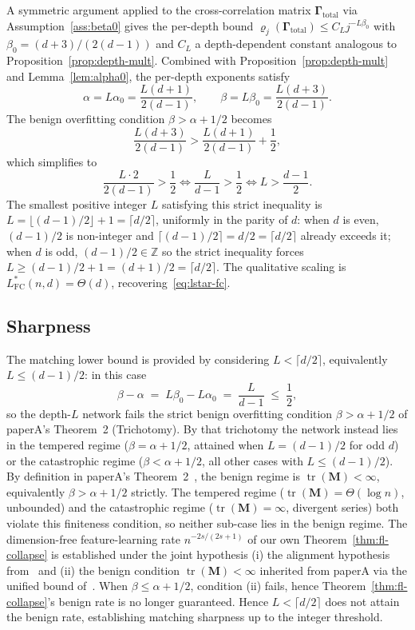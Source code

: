 \documentclass[12pt]{amsart}
\theoremstyle{definition}
\theoremstyle{remark}
\DeclareMathOperator{\tr}{tr}
\newcommand{\bM}{\mathbf{M}}
\newcommand{\bGamma}{\boldsymbol{\Gamma}}
\begin{document}
A symmetric argument applied to the cross-correlation matrix
$\bGamma_{\mathrm{total}}$ via Assumption~\ref{ass:beta0} gives the per-depth
bound $\varrho_{j}(\bGamma_{\mathrm{total}}) \leq C_{L} j^{-L\beta_{0}}$
with $\beta_{0} = (d+3)/(2(d-1))$ and $C_{L}$ a depth-dependent constant
analogous to Proposition~\ref{prop:depth-mult}. Combined with
Proposition~\ref{prop:depth-mult} and Lemma~\ref{lem:alpha0}, the
per-depth exponents satisfy
\[
  \alpha = L\alpha_{0} = \frac{L(d+1)}{2(d-1)}, \qquad
  \beta = L\beta_{0} = \frac{L(d+3)}{2(d-1)}.
\]
The benign overfitting condition $\beta > \alpha + 1/2$ becomes
\[
  \frac{L(d+3)}{2(d-1)} > \frac{L(d+1)}{2(d-1)} + \frac{1}{2},
\]
which simplifies to
\[
  \frac{L\cdot 2}{2(d-1)} > \frac{1}{2}
  \iff
  \frac{L}{d-1} > \frac{1}{2}
  \iff
  L > \frac{d-1}{2}.
\]
The smallest positive integer $L$ satisfying this strict inequality is
$L = \lfloor (d-1)/2 \rfloor + 1 = \lceil d/2 \rceil$, uniformly in the
parity of $d$: when $d$ is even, $(d-1)/2$ is non-integer and
$\lceil (d-1)/2\rceil = d/2 = \lceil d/2 \rceil$ already exceeds it;
when $d$ is odd, $(d-1)/2 \in \mathbb{Z}$ so the strict inequality
forces $L \ge (d-1)/2 + 1 = (d+1)/2 = \lceil d/2 \rceil$. The
qualitative scaling is $L^{*}_{\mathrm{FC}}(n,d) = \Theta(d)$,
recovering~\eqref{eq:lstar-fc}.

\subsection{Sharpness}

The matching lower bound is provided by considering
$L < \lceil d/2 \rceil$, equivalently $L \le (d-1)/2$: in this case
\[
  \beta - \alpha \;=\; L\beta_{0} - L\alpha_{0}
  \;=\; \frac{L}{d-1} \;\le\; \frac{1}{2},
\]
so the depth-$L$ network fails the strict benign overfitting condition
$\beta > \alpha + 1/2$ of paperA's Theorem~2 (Trichotomy). By that
trichotomy the network instead lies in the tempered regime
($\beta = \alpha + 1/2$, attained when $L = (d-1)/2$ for odd $d$) or
the catastrophic regime ($\beta < \alpha + 1/2$, all other cases with
$L \le (d-1)/2$). By definition in paperA's Theorem~2~\cite[Theorem~2]{paperA}, the
benign regime is $\tr(\bM) < \infty$, equivalently
$\beta > \alpha + 1/2$ strictly. The tempered regime
($\tr(\bM) = \Theta(\log n)$, unbounded) and the catastrophic
regime ($\tr(\bM) = \infty$, divergent series) both violate this
finiteness condition, so neither sub-case lies in the benign
regime. The dimension-free feature-learning rate $n^{-2s/(2s+1)}$
of our own Theorem~\ref{thm:fl-collapse} is established under the
joint hypothesis (i) the alignment hypothesis from~\cite{paperB}
and (ii) the benign condition $\tr(\bM) < \infty$ inherited from
paperA via the unified bound of~\cite[Thm.~1]{paperA}.  When
$\beta \le \alpha + 1/2$, condition (ii) fails, hence
Theorem~\ref{thm:fl-collapse}'s benign rate is no longer guaranteed.
Hence $L < \lceil d/2 \rceil$ does not attain the benign rate,
establishing matching sharpness up to the integer threshold.
\end{document}
